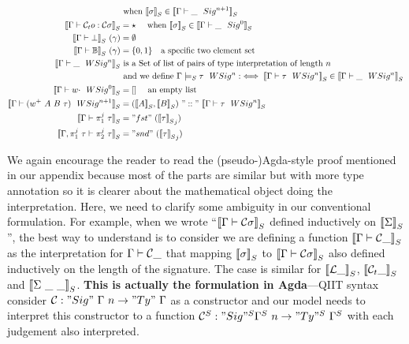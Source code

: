 \begin{align*}
  & \text{ when } \denotesS{\sigma} \in \denotesS{\goodSig{\Gamma}{\_}{n+1}} \\
  \denotesS{\goodTerm{\Gamma}{\cCt o}{\cC\sigma}}
  &= \star \quad \text{ when } \denotesS{\sigma} \in \denotesS{\goodSig{\Gamma}{\_}{0}} \\
  \denotesS{\goodType{\Gamma}{\bot}{i}} \ (\gamma) &= \emptyset \\
  \denotesS{\goodType{\Gamma}{\cB}{i}} \ (\gamma) &= \{0, 1\} \quad \text{a specific two element set} \\
  \denotesS{\goodWSig{\Gamma}{\_}{n}} &\text{ is a Set of list of pairs of type interpretation of length } n \\
  & \text{ and we define } \goodWSigS{\Gamma}{\tau}{n} :\iff \denotesS{\goodWSig{\Gamma}{\tau}{n}} \in \denotesS{\goodWSig{\Gamma}{\_}{n}}\\
  \denotesS{\goodWSig{\Gamma}{w\cdot}{0}} &= [] \quad \text{ an empty list} \\ 
  \denotesS{\goodWSig{\Gamma}{(w^+ \ A \ B \ \tau)}{n+1}}
  &= (\denotesS{A}, \denotesS{B})~"::"~\denotesS{\goodWSig{\Gamma}{\tau}{n}} \\ 
  \denotesS{\goodType{\Gamma}{\pi^j_1~\tau}{}} &= "fst"~({\denotesS{\tau}}_{j})\\
  \denotesS{\goodType{\Gamma, \pi^j_1~\tau}{\pi^j_2~\tau}{}} &= "snd"~({\denotesS{\tau}}_j)\\
\end{align*}


We again encourage the reader to read the (pseudo-)Agda-style proof mentioned in our appendix because most of the parts are similar but with more type annotation so it is clearer about the mathematical object doing the interpretation. Here, we need to clarify some ambiguity in our conventional formulation. For example, when we wrote ``$\denotesS{\goodType{\Gamma}{\cC \sigma}{}}$ defined inductively on $\denotesS{\Sigma}$'', the best way to understand is to consider we are defining a function $\denotesS{\goodType{\Gamma}{\cC \_}{}}$ as the interpretation for $\goodType{\Gamma}{\cC \_}{}$ that mapping $\denotesS{\sigma}$ to $\denotesS{\goodType{\Gamma}{\cC \sigma}{}}$ also defined inductively on the length of the signature. The case is similar for $\denotesS{\cL \_}$, $\denotesS{\cCt \_}$ and  $\denotesS{\Sigma \ \_ \ \_}$. \textbf{This is actually the formulation in Agda}---QIIT syntax consider $\cC : "Sig"~\Gamma~n \to "Ty"~\Gamma$ as a constructor and our model needs to interpret this constructor to a function $\cC^S : "Sig"^S \Gamma^S~n \to "Ty"^S~\Gamma^S$ with each judgement also interpreted. 

